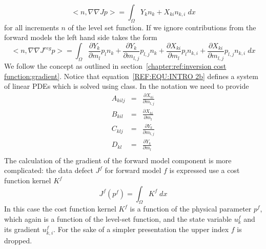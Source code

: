 \begin{equation}\label{REF:EQU:INTRO 2b}
<n,\nabla \nabla J p > = \int_{\Omega} Y_k n_k + X_{ki} n_{k,i} \; dx
\end{equation} 
for all increments $n$ of the level set function. If we ignore contributions 
from the forward models the left hand side takes the form
\begin{equation}\label{REF:EQU:INTRO 2c}
<n,\nabla \nabla J^{reg} p > = \int_{\Omega} 
\displaystyle{\frac{\partial Y_k}{\partial m_l}} p_l n_k +
\displaystyle{\frac{\partial Y_k}{\partial m_{l,j}}} p_{l,j} n_k +
\displaystyle{\frac{\partial X_{ki}}{\partial m_l}} p_l n_{k,i} +
\displaystyle{\frac{\partial X_{ki}}{\partial m_{l,j}}} p_{l,j} n_{k,i} 
\; dx
\end{equation}  We follow the concept as outlined in section~\ref{chapter:ref:inversion cost function:gradient}.
Notice that equation~\ref{REF:EQU:INTRO 2b} defines a system of linear PDEs
which is solved using \escript {} class. In the \escript notation we need to provide 
\begin{equation}\label{ref:EQU:REG:600}
\begin{array}{rcl}
 A_{kilj} & = &  \displaystyle{\frac{\partial X_{ki}}{\partial m_{l,j}}}  \\
 B_{kil} & = &  \displaystyle{\frac{\partial X_{ki}}{\partial m_l}}   \\
 C_{klj} & = &  \displaystyle{\frac{\partial Y_k}{\partial m_{l,j}}}    \\
  D_{kl} & = & \displaystyle{\frac{\partial Y_k}{\partial m_l}}    \\ 
\end{array}
\end{equation} 
The calculation of the gradient of the forward model component is more complicated:
the data defect $J^{f}$ for forward model $f$ is expressed use a cost function kernel $K^{f}$ 
\begin{equation}\label{REF:EQU:INTRO 2bb}
J^{f}(p^f) = \int_{\Omega} K^{f} \; dx
\end{equation} 
In this case the cost function kernel $K^{f}$ is a function of the 
physical parameter $p^f$, which again is a function of the level-set function,
and the state variable $u^f_{k}$ and its gradient $u^f_{k,i}$. For the sake of a simpler 
presentation the upper index $f$ is dropped.
 
